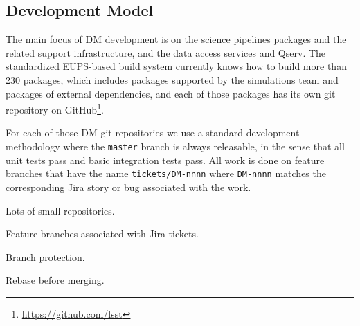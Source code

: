\subsection{Development Model}


The main focus of DM development is on the science pipelines packages\cite{2018PASJ...70S...5B} and the related support infrastructure, and the data access services and Qserv\cite{2011Wang:2011:QDS:2063348.2063364}.
The standardized EUPS-based build system currently knows how to build more than 230 packages, which includes packages supported by the simulations team\cite{2014SPIE.9150E..14C} and packages of external dependencies, and each of those packages has its own git repository on GitHub\footnote{\url{https://github.com/lsst}}.

For each of those DM git repositories we use a standard development methodology where the \texttt{master} branch is always releasable, in the sense that all unit tests pass and basic integration tests pass.
All work is done on feature branches that have the name \texttt{tickets/DM-nnnn} where \texttt{DM-nnnn} matches the corresponding Jira story or bug associated with the work.

Lots of small repositories.

Feature branches associated with Jira tickets.

Branch protection.

Rebase before merging.


